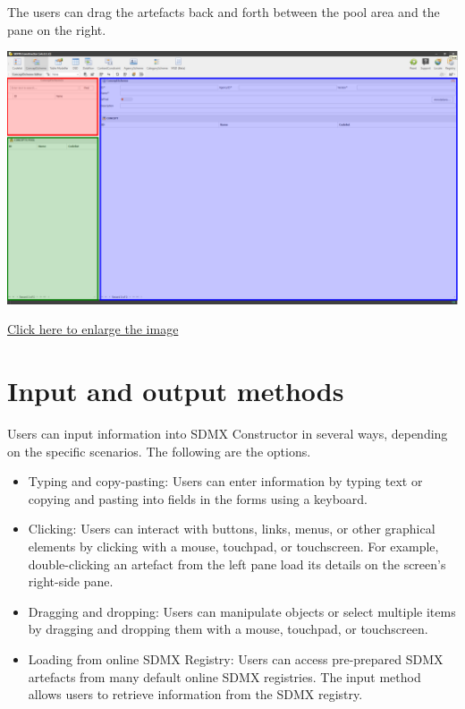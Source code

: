 \documentclass[
]{book}
\providecommand{\tightlist}{%
  \setlength{\itemsep}{0pt}\setlength{\parskip}{0pt}}
\begin{document}
The users can drag the artefacts back and forth between the pool area and the pane on the right.

\begin{center}\includegraphics[width=1\linewidth]{./images/image042} \end{center}

\href{images/image042.png}{Click here to enlarge the image}

\hypertarget{input-and-output-methods}{%
\section{Input and output methods}\label{input-and-output-methods}}

Users can input information into SDMX Constructor in several ways, depending on the specific scenarios. The following are the options.

\begin{itemize}
\tightlist
\item
  Typing and copy-pasting: Users can enter information by typing text or copying and pasting into fields in the forms using a keyboard.
\item
  Clicking: Users can interact with buttons, links, menus, or other graphical elements by clicking with a mouse, touchpad, or touchscreen. For example, double-clicking an artefact from the left pane load its details on the screen's right-side pane.
\item
  Dragging and dropping: Users can manipulate objects or select multiple items by dragging and dropping them with a mouse, touchpad, or touchscreen.
\item
  Loading from online SDMX Registry: Users can access pre-prepared SDMX artefacts from many default online SDMX registries. The input method allows users to retrieve information from the SDMX registry.
\end{itemize}
\end{document}
